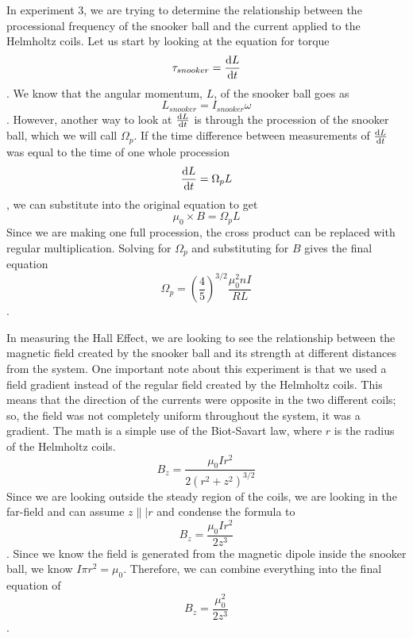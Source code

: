\documentclass[aps,prl,10pt,twocolumn,floatfix]{revtex4-2}
\begin{document}
In experiment 3, we are trying to determine the relationship between the processional frequency of the snooker ball and the current applied to the Helmholtz coils. 
Let us start by looking at the equation for torque
\begin{equation*}
    \tau_{snooker}=\dv{L}{t}
\end{equation*}.
We know that the angular momentum, $L$, of the snooker ball goes as 
\begin{equation*}
    L_{snooker}=I_{snooker}\omega
\end{equation*}.
However, another way to look at $\dv{L}{t}$ is through the procession of the snooker ball, which we will call $\Omega_p$.
If the time difference between measurements of $\dv{L}{t}$ was equal to the time of one whole procession
\begin{equation*}
    \dv{L}{t}=\Omega_pL
\end{equation*},
we can substitute into the original equation to get
\begin{equation*}
    \mu_0 \times B=\Omega_pL
\end{equation*}
Since we are making one full procession, the cross product can be replaced with regular multiplication.
Solving for $\Omega_p$ and substituting for $B$ gives the final equation
\begin{equation}
    \Omega_p=\left(\frac{4}{5}\right) ^{3/2}\frac{\mu_0^2nI}{RL}
\end{equation}.

In measuring the Hall Effect, we are looking to see the relationship between the magnetic field created by the snooker ball and its strength at different distances from the system. 
One important note about this experiment is that we used a field gradient instead of the regular field created by the Helmholtz coils.
This means that the direction of the currents were opposite in the two different coils;
so, the field was not completely uniform throughout the system, it was a gradient.
The math is a simple use of the Biot-Savart law, where $r$ is the radius of the Helmholtz coils.
\begin{equation*}
    B_z=\frac{\mu_0Ir^2}{2(r^2+z^2)^{3/2}}
\end{equation*}
Since we are looking outside the steady region of the coils, we are looking in the far-field and can assume $z\||r$ and condense the formula to
\begin{equation*}
    B_z=\frac{\mu_0Ir^2}{2z^3}
\end{equation*}.
Since we know the field is generated from the magnetic dipole inside the snooker ball, we know $I\pi r^2=\mu_0$.
Therefore, we can combine everything into the final equation of 
\begin{equation}
    B_z=\frac{\mu_0^2}{2z^3}
\end{equation}.
\end{document}
